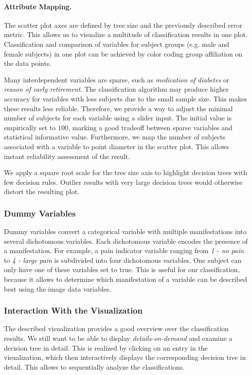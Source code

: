 \documentclass[a4paper,twoside]{style/article}
\begin{document}
\paragraph{Attribute Mapping.}
The scatter plot axes are defined by tree size and the previously described error metric.
This allows us to visualize a multitude of classification results in one plot.
Classification and comparison of variables for subject groups (e.g. male and female subjects) in one plot can be achieved by color coding group affiliation on the data points.

Many interdependent variables are sparse, such as \emph{medication of diabetes} or \emph{reason of early retirement}.
The classification algorithm may produce higher accuracy for variables with less subjects due to the small sample size.
This makes these results less reliable.
Therefore, we provide a way to adjust the minimal number of subjects for each variable using a slider input.
The initial value is empirically set to $100$, marking a good tradeoff between sparse variables and statistical informative value.
Furthermore, we map the number of subjects associated with a variable to point diameter in the scatter plot.
This allows instant reliability assessment of the result.

We apply a square root scale for the tree size axis to highlight decision trees with few decision rules.
Outlier results with very large decision trees would otherwise distort the resulting plot.
\subsubsection{Dummy Variables}
Dummy variables convert a categorical variable with multiple manifestations into several dichotomous variables.
Each dichotomous variable encodes the presence of a manifestation.
For example, a pain indicator variable ranging from \emph{1 - no pain} to \emph{4 - large pain} is subdivided into four dichotomous variables.
One subject can only have one of these variables set to true.
This is useful for our classification, because it allows to determine which manifestation of a variable can be described best using the image data variables.
\subsubsection{Interaction With the Visualization}
The described visualization provides a good overview over the classification results.
We still want to be able to display \emph{details-on-demand} \cite{shneiderman1996} and examine a decision tree in detail.
This is realized by clicking on an entry in the visualization, which then interactively displays the corresponding decision tree in detail.
This allows to sequentially analyze the classifications.
\end{document}
